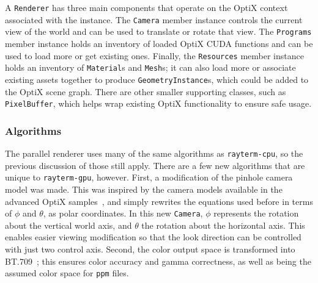 A \texttt{Renderer} has three main components that operate on the OptiX context associated with the instance.
The \texttt{Camera} member instance controls the current view of the world and can be used to translate or rotate that view.
The \texttt{Programs} member instance holds an inventory of loaded OptiX CUDA functions and can be used to load more or get existing ones.
Finally, the \texttt{Resources} member instance holds an inventory of \texttt{Material}s and \texttt{Mesh}s; it can also load more or associate existing assets together to produce \texttt{GeometryInstance}s, which could be added to the OptiX scene graph.
There are other smaller supporting classes, such as \texttt{PixelBuffer}, which helps wrap existing OptiX functionality to ensure safe usage.

\subsubsection{Algorithms}
\label{ch:methods:renderer:parallel:algorithms}

The parallel renderer uses many of the same algorithms as \texttt{rayterm-cpu}, so the previous discussion of those still apply.
There are a few new algorithms that are unique to \texttt{rayterm-gpu}, however.
First, a modification of the pinhole camera model was made.
This was inspired by the camera models available in the advanced OptiX samples~\cite{optixsamples}, and simply rewrites the equations used before in terms of $\phi$ and $\theta$, as polar coordinates.
In this new \texttt{Camera}, $\phi$ represents the rotation about the vertical world axis, and $\theta$ the rotation about the horizontal axis.
This enables easier viewing modification so that the look direction can be controlled with just two control axis.
Second, the color output space is transformed into BT.709~\cite{ituBT709}; this ensures color accuracy and gamma correctness, as well as being the assumed color space for \texttt{ppm} files.



